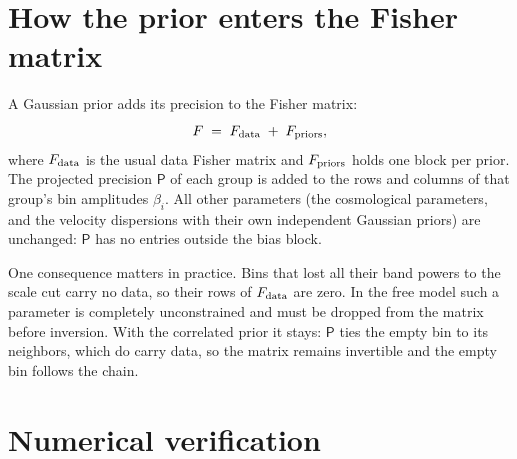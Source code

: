 \documentclass[11pt]{article}
\newcommand{\Prec}{\mathsf{P}}
\begin{document}
\section{How the prior enters the Fisher matrix}
\label{sec:fisher}

A Gaussian prior adds its precision to the Fisher matrix:
\begin{equation}
  F \;=\; F_{\rm data} \;+\; F_{\rm priors},
  \label{eq:fisher}
\end{equation}
where $F_{\rm data}$ is the usual data Fisher matrix and
$F_{\rm priors}$ holds one block per prior.  The projected precision
$\Prec$ of each group is added to the rows and columns of that group's
bin amplitudes $\beta_i$.  All other parameters (the cosmological
parameters, and the velocity dispersions with their own independent
Gaussian priors) are unchanged: $\Prec$ has no entries outside the
bias block.

One consequence matters in practice.  Bins that lost all
their band powers to the scale cut carry no data, so their rows of
$F_{\rm data}$ are zero.  In the free model such a parameter is
completely unconstrained and must be dropped from the matrix before
inversion.  With the correlated prior it stays: $\Prec$ ties the empty
bin to its neighbors, which do carry data, so the matrix remains
invertible and the empty bin follows the chain.

\section{Numerical verification}
\label{app:verify}
\end{document}
